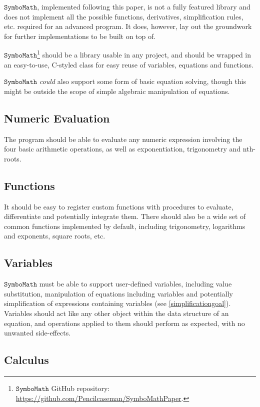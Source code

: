 \documentclass[12pt]{article}
\def\CC{{C\nolinebreak[4]\hspace{-.05em}\raisebox{.4ex}{\tiny\bf ++ }}}
\def\Symbo{{$\texttt{SymboMath}$}}
\begin{document}
\Symbo{}, implemented following this paper, is not a fully featured library and does not implement all the possible functions, derivatives, simplification rules, etc. required for an advanced program. It does, however, lay out the groundwork for further implementations to be built on top of.

\Symbo \footnote{\Symbo{} GitHub repository: \href{https://github.com/Pencilcaseman/SymboMathPaper}{https://github.com/Pencilcaseman/SymboMathPaper}.} should be a library usable in any  project, and should be wrapped in an easy-to-use, \CC-styled class for easy reuse of variables, equations and functions.

\Symbo{} \textit{could} also support some form of basic equation solving, though this might be outside the scope of simple algebraic manipulation of equations.

\subsection{Numeric Evaluation}

The program should be able to evaluate any numeric expression involving the four basic arithmetic operations, as well as exponentiation, trigonometry and nth-roots.

\subsection{Functions}

It should be easy to register custom functions with procedures to evaluate, differentiate and potentially integrate them. There should also be a wide set of common functions implemented by default, including trigonometry, logarithms and exponents, square roots, etc.

\subsection{Variables}

\Symbo{} must be able to support user-defined variables, including value substitution, manipulation of equations including variables and potentially simplification of expressions containing variables (see \ref{simplificationgoal}). Variables should act like any other object within the data structure of an equation, and operations applied to them should perform as expected, with no unwanted side-effects.

\subsection{Calculus}
\end{document}
